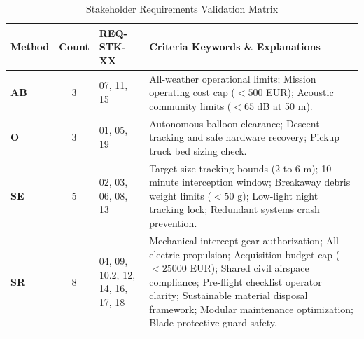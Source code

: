 \begin{table}[H]
\centering
\footnotesize
\caption{Stakeholder Requirements Validation Matrix}
\label{tab:stakeholder_vrm_consolidated}
\renewcommand{\arraystretch}{1.1}
\setlength{\tabcolsep}{4pt}
\begin{tabularx}{\textwidth}{@{}l c p{} X}
\toprule
\textbf{Method} & \textbf{Count} & \textbf{REQ-STK-XX} & \textbf{Criteria Keywords \& Explanations} \\
\midrule
\textbf{AB}  & 3 & 07, 11, 15 & 
All-weather operational limits; Mission operating cost cap ($< 500$ EUR); Acoustic community limits ($< 65$ dB at 50 m). \\
\midrule
\textbf{O}  & 3 & 01, 05, 19 & 
Autonomous balloon clearance; Descent tracking and safe hardware recovery; Pickup truck bed sizing check. \\
\midrule
\textbf{SE}  & 5 & 02, 03, 06, 08, 13 & 
Target size tracking bounds (2 to 6 m); 10-minute interception window; Breakaway debris weight limits ($< 50$ g); Low-light night tracking lock; Redundant systems crash prevention. \\
\midrule
\textbf{SR}  & 8 & 04, 09, 10.2, 12, 14, 16, 17, 18 & 
Mechanical intercept gear authorization; All-electric propulsion; Acquisition budget cap ($< 25000$ EUR); Shared civil airspace compliance; Pre-flight checklist operator clarity; Sustainable material disposal framework; Modular maintenance optimization; Blade protective guard safety. \\
\bottomrule
\end{tabularx}
\end{table}




